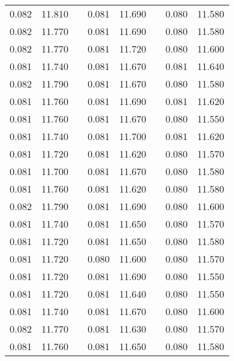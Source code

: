 \documentclass[12pt]{mwrep}
\begin{document}
\begin{table}[H]
\begin{tabularx}{\textwidth}{|Y|Y|p{2mm}|Y|Y|p{2mm}|Y|Y|}
			0.082 & 11.810 && 0.081 & 11.690 && 0.080 & 11.580 \\
			0.082 & 11.770 && 0.081 & 11.690 && 0.080 & 11.580 \\
			0.082 & 11.770 && 0.081 & 11.720 && 0.080 & 11.600 \\
			0.081 & 11.740 && 0.081 & 11.670 && 0.081 & 11.640 \\
			0.082 & 11.790 && 0.081 & 11.670 && 0.080 & 11.580 \\
			0.081 & 11.760 && 0.081 & 11.690 && 0.081 & 11.620 \\
			0.081 & 11.760 && 0.081 & 11.670 && 0.080 & 11.550 \\
			0.081 & 11.740 && 0.081 & 11.700 && 0.081 & 11.620 \\
			0.081 & 11.720 && 0.081 & 11.620 && 0.080 & 11.570 \\
			0.081 & 11.700 && 0.081 & 11.670 && 0.080 & 11.580 \\
			0.081 & 11.760 && 0.081 & 11.620 && 0.080 & 11.580 \\
			0.082 & 11.790 && 0.081 & 11.690 && 0.080 & 11.600 \\
			0.081 & 11.740 && 0.081 & 11.650 && 0.080 & 11.570 \\
			0.081 & 11.720 && 0.081 & 11.650 && 0.080 & 11.580 \\
			0.081 & 11.720 && 0.080 & 11.600 && 0.080 & 11.570 \\
			0.081 & 11.720 && 0.081 & 11.690 && 0.080 & 11.550 \\
			0.081 & 11.720 && 0.081 & 11.640 && 0.080 & 11.550 \\
			0.081 & 11.740 && 0.081 & 11.670 && 0.080 & 11.600 \\
			0.082 & 11.770 && 0.081 & 11.630 && 0.080 & 11.570 \\
			0.081 & 11.760 && 0.081 & 11.650 && 0.080 & 11.580 \\

\end{tabularx}
\end{table}
\end{document}
